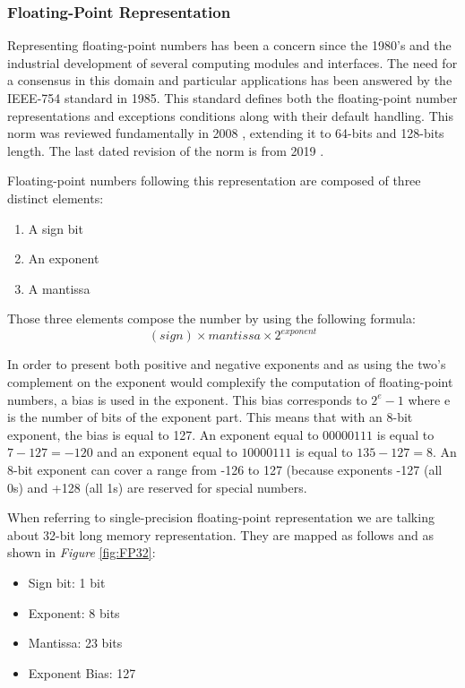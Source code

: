 \subsubsection{Floating-Point Representation}

Representing floating-point numbers has been a concern since the 1980's and the industrial development of several computing modules and interfaces. The need for a consensus in this domain and particular applications has been answered by the IEEE-754 standard \cite{Ieee754_1985} in 1985. This standard defines both the floating-point number representations and exceptions conditions along with their default handling. This norm was reviewed fundamentally in 2008 \cite{Ieee754_2008}, extending it to 64-bits and 128-bits length. The last dated revision of the norm is from 2019 \cite{Ieee754_2019}.

Floating-point numbers following this representation are composed of three distinct elements:
\begin{enumerate}
  \item A sign bit
  \item An exponent
  \item A mantissa
\end{enumerate}

Those three elements compose the number by using the following formula:
\begin{equation}
  (sign) \times mantissa \times 2^{exponent}
\end{equation}

In order to present both positive and negative exponents and as using the two's complement on the exponent would complexify the computation of floating-point numbers, a bias is used in the exponent. This bias corresponds to $2^e - 1$ where e is the number of bits of the exponent part. This means that with an 8-bit exponent, the bias is equal to 127. An exponent equal to $00000111$ is equal to $7 - 127 = -120$ and an exponent equal to $10000111$ is equal to $135 - 127 = 8$. An 8-bit exponent can cover a range from -126 to 127 (because exponents -127 (all 0s) and +128 (all 1s) are reserved for special numbers.

When referring to single-precision floating-point representation we are talking about 32-bit long memory representation. They are mapped as follows and as shown in \emph{Figure} \ref{fig:FP32}:
\begin{itemize}
  \item Sign bit: 1 bit
  \item Exponent: 8 bits
  \item Mantissa: 23 bits
  \item Exponent Bias: 127
\end{itemize}

